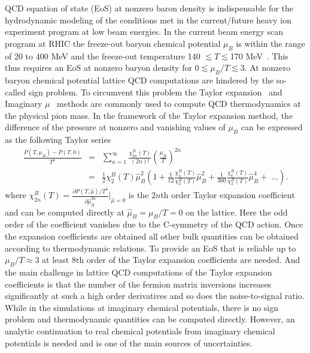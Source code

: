 \documentclass{PoS}
\newcommand{\hmu}{\hat{\mu}}
\begin{document}
QCD equation of state (EoS) at nonzero baron density is indispensable for the hydrodynamic modeling of the conditions met in the current/future heavy ion 
experiment program at low beam energies. In the current beam energy scan program at RHIC the  freeze-out baryon chemical potential $\mu_B$ is within the range of 20 to 400 MeV and the freeze-out temperature 140 $\lesssim T\lesssim$170 MeV~\cite{Cleymans:2005xv,Andronic:2008gu}. This thus requires an EoS at nonzero baryon density for 0$\lesssim \mu_B/T\lesssim$3.
At nonzero baryon chemical potential lattice QCD computations are hindered by the so-called sign problem.
To circumvent this problem the Taylor expansion~\cite{Allton:2002zi,Gavai:2003mf} and Imaginary $\mu$~\cite{deForcrand:2002hgr,DElia:2002tig} methods are commonly used to compute QCD thermodynamics at the physical pion mass.  
In the framework of the Taylor expansion method, the difference of the pressure at nonzero and vanishing values of $\mu_B$
can be expressed as the following Taylor series
\begin{eqnarray}
\frac{P(T,\mu_B)-P(T,0)}{T^4} &=&  
\sum_{n=1}^\infty \frac{\chi_{2n}^{B}(T)}{(2n)!}
\left(\frac{\mu_B}{T}\right)^{2n}  \\
&=& \frac{1}{2} \chi_{2}^B(T) \hmu_B^2 \left( 1+ \frac{1}{12}
\frac{\chi_{4}^B(T)}{\chi_{2}^B(T)} \hmu_B^2
+ \frac{1}{360}\frac{\chi_{6}^B(T)}{\chi_{2}^B(T)} \hmu_B^4+\; ... \right)
\label{eq:PmuB}.
\end{eqnarray} 
where $\chi_{2n}^{B}(T)=\frac{\partial P(T,\hmu)/T^4}{\partial \hmu_B^{2n}}|_{\hmu=0}$ is the $2n$th order Taylor expansion coefficient and can be computed directly at $\hat{\mu}_B=\mu_B/T=0$ on the lattice. Here the odd order of the coefficient vanishes due
to the C-symmetry of the QCD action. Once the expansion coefficients are obtained  all other bulk quantities can be obtained according to thermodynamic relations.
To provide an EoS that is reliable up to $\mu_B/T\approx$3
at least 8th order of the Taylor expansion coefficients are needed.  And the main challenge in lattice QCD computations of the Taylor expansion coefficients is that the number of the fermion matrix inversions increases significantly at such a high order derivatives and so does the noise-to-signal ratio.  While in the simulations at imaginary chemical potentials, there is no sign problem and thermodynamic quantities can be computed directly. However, an analytic continuation to real chemical potentials from imaginary chemical potentials is needed and is one of the main sources of uncertainties.
\end{document}
